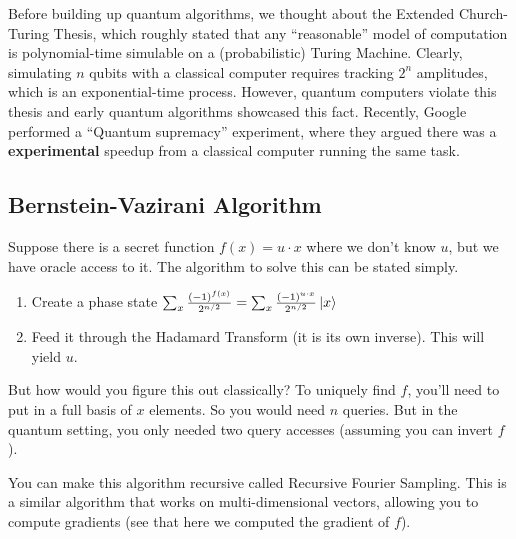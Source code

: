 Before building up quantum algorithms, we thought about the Extended Church-Turing Thesis, which roughly stated that any ``reasonable'' model of computation is
polynomial-time simulable on a (probabilistic) Turing Machine. Clearly, simulating $n$ qubits with a classical computer requires tracking $2^n$ amplitudes,
which is an exponential-time process. However, quantum computers violate this thesis and early quantum algorithms showcased this fact. Recently,
Google performed a ``Quantum supremacy'' experiment, where they argued there was a \textbf{experimental} speedup from a classical computer running the same task.

\subsection{Bernstein-Vazirani Algorithm}
Suppose there is a secret function $f(x) = u \cdot x$ where we don't know $u$,
but we have oracle access to it. The algorithm to solve this can be stated simply.

\begin{enumerate}
    \item Create a phase state $\sum_x \frac{(-1)^{f(x)}}{2^{n/2}} = \sum_x \frac{(-1)^{u \cdot x}}{2^{n/2}} \ket{x}$
    \item Feed it through the Hadamard Transform (it is its own inverse). This will yield $u$.
\end{enumerate}

But how would you figure this out classically? To uniquely find $f$, you'll need to put in a full basis of $x$ elements.
So you would need $n$ queries. But in the quantum setting, you only needed two query accesses (assuming you can invert $f$).

You can make this algorithm recursive called Recursive Fourier Sampling. This is a similar algorithm that works on
multi-dimensional vectors, allowing you to compute gradients (see that here we computed the gradient of $f$).

